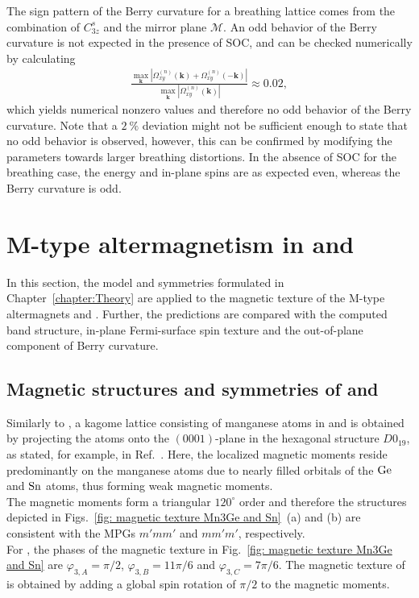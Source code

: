 The sign pattern of the Berry curvature for a breathing lattice comes from the combination of $C_{3z}^s$ and the mirror plane $\mathcal{M}$. An odd behavior of the Berry curvature is not expected in the presence of SOC, and can be checked numerically by calculating
\begin{align}
\frac{\max_{\mathbf{k}}\left|\Omega_{xy}^{(n)}(\mathbf{k})+\Omega_{xy}^{(n)}(-\mathbf{k})\right|}{\max_{\mathbf{k}}\left|\Omega_{xy}^{(n)}(\mathbf{k})\right|}\approx 0.02, \nonumber
\end{align}
which yields numerical nonzero values and therefore no odd behavior of the Berry curvature. Note that a $\SI{2}{\percent}$ deviation might not be sufficient enough to state that no odd behavior is observed, however, this can be confirmed by modifying the parameters towards larger breathing distortions.
In the absence of SOC for the breathing case, the energy and in-plane spins are as expected even, whereas the Berry curvature is odd.
\newpage
\section{M-type altermagnetism in  and }
In this section, the model and symmetries formulated in Chapter~\ref{chapter:Theory} are applied to the magnetic texture of the M-type altermagnets  and . 
Further, the predictions are compared with the computed band structure, in-plane Fermi-surface spin texture and the out-of-plane component of Berry curvature.

\subsection{Magnetic structures and symmetries of  and }

Similarly to , a kagome lattice consisting of manganese atoms in  and  is obtained by projecting the atoms onto the $(0001)$-plane in the hexagonal structure $D0_{19}$, as stated, for example, in Ref.~\cite{10.1063/1.5064697}. Here, the localized magnetic moments reside predominantly on the manganese atoms due to nearly filled orbitals of the $\ce{Ge}$ and $\ce{Sn}$ atoms, thus forming weak magnetic moments. \\
The magnetic moments form a triangular $120^\circ$ order and therefore the structures depicted in Figs.~\ref{fig: magnetic texture Mn3Ge and Sn}~(a) and (b) are consistent with the MPGs $m'mm'$ and $mm'm'$, respectively.\\
For , the phases of the magnetic texture in Fig.~\ref{fig: magnetic texture Mn3Ge and Sn} are $\varphi_{3,A} = \pi/2$, $\varphi_{3,B} = 11\pi/6$ and $\varphi_{3,C}= 7\pi/6$. The magnetic texture of  is obtained by adding a global spin rotation of $\pi/2$ to the magnetic moments.\\

